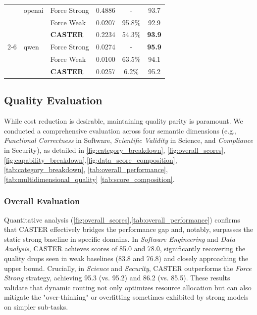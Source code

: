 \documentclass{article}
\theoremstyle{plain}
\theoremstyle{definition}
\theoremstyle{remark}
\begin{document}
\begin{table}[t]
\begin{minipage}{0.48\textwidth}
{\begin{tabular}{lllccc}
             & openai & Force Strong & 0.4886 & - & 93.7 \\
             &  & Force Weak & 0.0207 & 95.8\% & 92.9 \\
             &  & \textbf{CASTER} & 0.2234 & 54.3\% & \textbf{93.9} \\
             \cmidrule{2-6}
             & qwen & Force Strong & 0.0274 & - & \textbf{95.9} \\
             &  & Force Weak & 0.0100 & 63.5\% & 94.1 \\
             &  & \textbf{CASTER} & 0.0257 & 6.2\% & 95.2 \\
            \bottomrule
        \end{tabular}%
        }
    \end{minipage}
\end{table}

\subsection{Quality Evaluation}

While cost reduction is desirable, maintaining quality parity is paramount. We conducted a comprehensive evaluation across four semantic dimensions (e.g., \textit{Functional Correctness} in Software, \textit{Scientific Validity} in Science, and \textit{Compliance} in Security), as detailed in \cref{fig:category_breakdown}, \cref{fig:overall_scores}, \cref{fig:capability_breakdown},\cref{fig:data_score_composition},\cref{tab:category_breakdown}, \cref{tab:overall_performance},\cref{tab:multidimensional_quality} \cref{tab:score_composition}.

\subsubsection{Overall Evaluation} Quantitative analysis (\cref{fig:overall_scores},\cref{tab:overall_performance}) confirms that CASTER effectively bridges the performance gap and, notably, surpasses the static strong baseline in specific domains. In \textit{Software Engineering} and \textit{Data Analysis}, CASTER achieves scores of 85.0 and 78.0, significantly recovering the quality drops seen in weak baselines (83.8 and 76.8) and closely approaching the upper bound. Crucially, in \textit{Science} and \textit{Security}, CASTER outperforms the \textit{Force Strong} strategy, achieving 95.3 (vs. 95.2) and 86.2 (vs. 85.5). These results validate that dynamic routing not only optimizes resource allocation but can also mitigate the "over-thinking" or overfitting sometimes exhibited by strong models on simpler sub-tasks.
\end{document}
